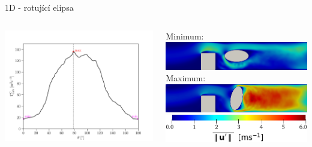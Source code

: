 \documentclass[aspectratio=169,xcolor=dvipsnames]{beamer}
\begin{document}
\begin{frame}{1D - rotující elipsa}
	\addtocounter{framenumber}{-1}
	\begin{columns}
		\begin{column}{.56\textwidth}
			\includegraphics[width=1\linewidth, trim={0 0 0 0}, clip]{Images/elip2interpolated.pdf}			
		\end{column}
		\begin{column}{.52\textwidth}
			Minimum:\\[4pt]
			\includegraphics[width=0.9\linewidth, trim={0 0 0 0}, clip]{Images/ellipse2_min_aa.png}
			\\ \vspace{2mm}
			Maximum:\\[4pt]	
			\includegraphics[width=0.9\linewidth, trim={0 0 0 0}, clip]{Images/ellipse2_max_a.png}
			\\ \vspace{4mm}		
			\centering
			\hspace{-6mm}\includegraphics[width=0.6\linewidth, trim={0 0 0 0}, clip]{Images/ellipse12_legenda.png}
		\end{column}
	\end{columns}
\end{frame}
\end{document}
